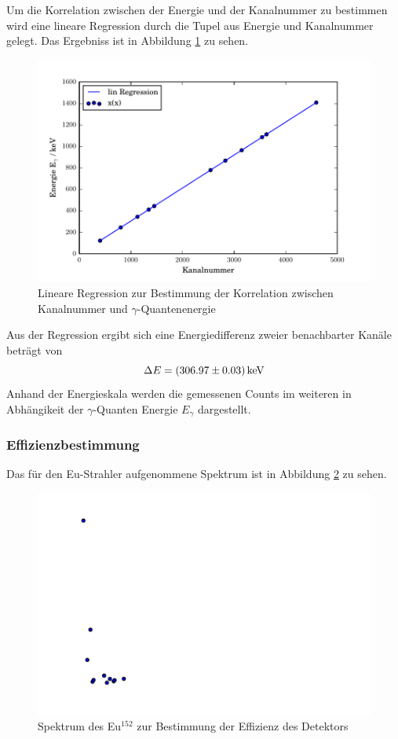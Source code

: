 Um die Korrelation zwischen der Energie und der Kanalnummer zu bestimmen wird eine lineare Regression durch die Tupel aus Energie und Kanalnummer gelegt. Das Ergebniss ist in Abbildung \ref{fig:RegCs} zu sehen.

\begin{figure}[htpb]
  \centering
  \includegraphics[width=\textwidth]{./build/CsReg.pdf}
  \caption{Lineare Regression zur Bestimmung der Korrelation zwischen Kanalnummer und $\gamma$-Quantenenergie}
  \label{fig:RegCs}
\end{figure}

Aus der Regression ergibt sich eine Energiedifferenz zweier benachbarter Kanäle beträgt von
\begin{equation}
  \Delta E = (\num{306.97 +- 0.03}) \, \text{keV}
  \label{eqn:Reg}
\end{equation}
Anhand der Energieskala werden die gemessenen Counts im weiteren in Abhängikeit der $\gamma$-Quanten Energie $E_{\gamma}$ dargestellt.


\subsubsection{Effizienzbestimmung}
\label{sec:Q}
Das für den Eu-Strahler aufgenommene Spektrum ist in Abbildung \ref{fig:SpekCs} zu sehen.

\begin{figure}[htpb]
  \centering
  \includegraphics[width=\textwidth]{./build/SpektEu.pdf}
   \caption{Spektrum des Eu$^{152}$ zur Bestimmung der Effizienz des Detektors}
  \label{fig:SpekCs}
\end{figure}

